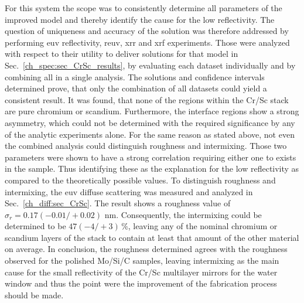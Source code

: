 For this system the scope was to consistently determine all parameters of the improved model and thereby identify the cause for the low reflectivity. The question of uniqueness and accuracy of the solution was therefore addressed by performing \gls{euv} reflectivity, \gls{reuv}, \gls{xrr} and \gls{xrf} experiments. Those were analyzed with respect to their utility to deliver solutions for that model in Sec.~\ref{ch_spec:sec_CrSc_results}, by evaluating each dataset individually and by combining all in a single analysis. The solutions and confidence intervals determined prove, that only the combination of all datasets could yield a consistent result. It was found, that none of the regions within the Cr/Sc stack are pure chromium or scandium. Furthermore, the interface regions show a strong asymmetry, which could not be determined with the required significance by any of the analytic experiments alone. For the same reason as stated above, not even the combined analysis could distinguish roughness and intermixing. Those two parameters were shown to have a strong correlation requiring either one to exists in the sample. Thus identifying these as the explanation for the low reflectivity as compared to the theoretically possible values. To distinguish roughness and intermixing, the \gls{euv} diffuse scattering was measured and analyzed in Sec.~\ref{ch_diff:sec_CrSc}. The result shows a roughness value of $\sigma_r = 0.17  (-0.01/+0.02)$ nm. Consequently, the intermixing could be determined to be $47 (-4/+3)\, \%$, leaving any of the nominal chromium or scandium layers of the stack to contain at least that amount of the other material on average. In conclusion, the roughness determined agrees with the roughness observed for the polished Mo/Si/C samples, leaving intermixing as the main cause for the small reflectivity of the Cr/Sc multilayer mirrors for the water window and thus the point were the improvement of the fabrication process should be made.



